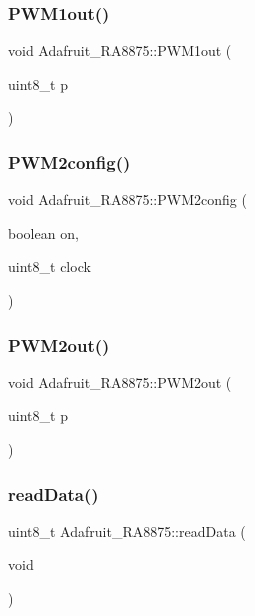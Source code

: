 \subsubsection{\texorpdfstring{PWM1out()}{PWM1out()}}
{\footnotesize\ttfamily void Adafruit\+\_\+\+R\+A8875\+::\+P\+W\+M1out (\begin{DoxyParamCaption}\item[{uint8\+\_\+t}]{p }\end{DoxyParamCaption})}

\mbox{\label{class_adafruit___r_a8875_a49df93bf32be7e85fbb0370ce9fe2f95}} 
\subsubsection{\texorpdfstring{PWM2config()}{PWM2config()}}
{\footnotesize\ttfamily void Adafruit\+\_\+\+R\+A8875\+::\+P\+W\+M2config (\begin{DoxyParamCaption}\item[{boolean}]{on,  }\item[{uint8\+\_\+t}]{clock }\end{DoxyParamCaption})}

\mbox{\label{class_adafruit___r_a8875_aaabcf8278287f64c28112fb976335c26}} 
\subsubsection{\texorpdfstring{PWM2out()}{PWM2out()}}
{\footnotesize\ttfamily void Adafruit\+\_\+\+R\+A8875\+::\+P\+W\+M2out (\begin{DoxyParamCaption}\item[{uint8\+\_\+t}]{p }\end{DoxyParamCaption})}

\mbox{\label{class_adafruit___r_a8875_a7771753841f0390793b69421ef86ffb6}} 
\subsubsection{\texorpdfstring{readData()}{readData()}}
{\footnotesize\ttfamily uint8\+\_\+t Adafruit\+\_\+\+R\+A8875\+::read\+Data (\begin{DoxyParamCaption}\item[{void}]{ }\end{DoxyParamCaption})}


